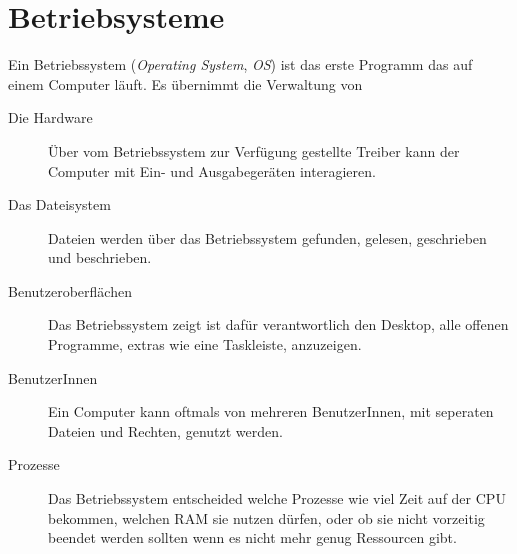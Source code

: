 \documentclass{article}
\begin{document}
\section{Betriebsysteme} 
Ein Betriebssystem (\emph{Operating System}, \emph{OS}) ist das erste Programm das auf einem Computer läuft.
Es übernimmt die Verwaltung von 
\begin{description}
 \item[Die Hardware] Über vom Betriebssystem zur Verfügung gestellte Treiber kann der Computer mit Ein- und Ausgabegeräten interagieren. 
 \item[Das Dateisystem] Dateien werden über das Betriebssystem gefunden, gelesen, geschrieben und beschrieben.
 \item[Benutzeroberflächen] Das Betriebssystem zeigt ist dafür verantwortlich den Desktop, alle offenen Programme, extras wie \zb eine Taskleiste, \etc anzuzeigen.
 \item[BenutzerInnen] Ein Computer kann oftmals von mehreren BenutzerInnen, mit seperaten Dateien und Rechten, genutzt werden.
 \item[Prozesse] Das Betriebssystem entscheided welche Prozesse wie viel Zeit auf der CPU bekommen, welchen RAM sie nutzen dürfen, oder ob sie nicht vorzeitig beendet werden sollten wenn es nicht mehr genug Ressourcen gibt.
\end{description}
\end{document}
